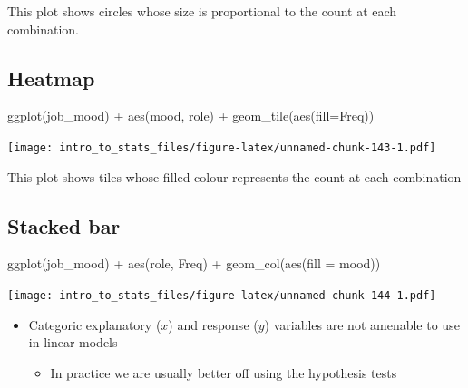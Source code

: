 \documentclass[
]{book}
\newenvironment{Shaded}{\begin{snugshade}}{\end{snugshade}}
\newcommand{\AttributeTok}[1]{\textcolor[rgb]{0.77,0.63,0.00}{#1}}
\newcommand{\FunctionTok}[1]{\textcolor[rgb]{0.00,0.00,0.00}{#1}}
\newcommand{\NormalTok}[1]{#1}
\newcommand{\SpecialCharTok}[1]{\textcolor[rgb]{0.00,0.00,0.00}{#1}}
\providecommand{\tightlist}{%
  \setlength{\itemsep}{0pt}\setlength{\parskip}{0pt}}
\newenvironment{roundup}
{ \begin{tcolorbox}[colbacktitle=yellow!50!white,
title=Round Up,coltitle=black,
fonttitle=\bfseries] }
{  \end{tcolorbox} }
\begin{document}
This plot shows circles whose size is proportional to the count at each combination.

\hypertarget{heatmap}{%
\subsection{Heatmap}\label{heatmap}}

\begin{Shaded}
\begin{Highlighting}[]
\FunctionTok{ggplot}\NormalTok{(job\_mood) }\SpecialCharTok{+} \FunctionTok{aes}\NormalTok{(mood, role) }\SpecialCharTok{+} \FunctionTok{geom\_tile}\NormalTok{(}\FunctionTok{aes}\NormalTok{(}\AttributeTok{fill=}\NormalTok{Freq))}
\end{Highlighting}
\end{Shaded}

\texttt{[image: intro\_to\_stats\_files/figure-latex/unnamed-chunk-143-1.pdf]}

This plot shows tiles whose filled colour represents the count at each combination

\hypertarget{stacked-bar}{%
\subsection{Stacked bar}\label{stacked-bar}}

\begin{Shaded}
\begin{Highlighting}[]
\FunctionTok{ggplot}\NormalTok{(job\_mood) }\SpecialCharTok{+} \FunctionTok{aes}\NormalTok{(role, Freq) }\SpecialCharTok{+} \FunctionTok{geom\_col}\NormalTok{(}\FunctionTok{aes}\NormalTok{(}\AttributeTok{fill =}\NormalTok{ mood))}
\end{Highlighting}
\end{Shaded}

\texttt{[image: intro\_to\_stats\_files/figure-latex/unnamed-chunk-144-1.pdf]}

\begin{roundup}
\begin{itemize}
\tightlist
\item
  Categoric explanatory (\(x\)) and response (\(y\)) variables are not amenable to use in linear models

  \begin{itemize}
  \tightlist
  \item
    In practice we are usually better off using the hypothesis tests
  \end{itemize}
\end{itemize}
\end{roundup}
\end{document}
